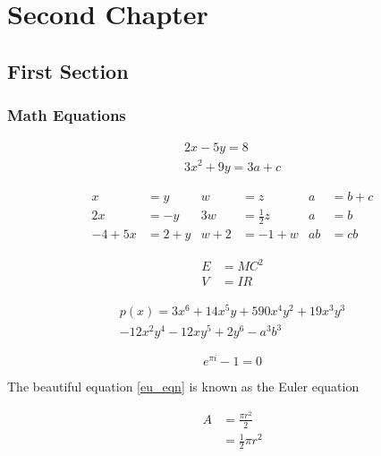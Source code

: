 \chapter{Second Chapter}
\lipsum[1-10]
\section{First Section}
\lipsum[1-10]
\subsection{Math Equations}

\begin{gather*} 
2x - 5y =  8 \\ 
3x^2 + 9y =  3a + c
\end{gather*}

\begin{align*}
x&=y           &  w &=z              &  a&=b+c\\
2x&=-y         &  3w&=\frac{1}{2}z   &  a&=b\\
-4 + 5x&=2+y   &  w+2&=-1+w          &  ab&=cb
\end{align*}

\begin{align} 
E &=MC^2 \\
V &=IR
\end{align}%
%
%


\begin{multline*}
p(x) = 3x^6 + 14x^5y + 590x^4y^2 + 19x^3y^3\\ 
- 12x^2y^4 - 12xy^5 + 2y^6 - a^3b^3
\end{multline*}

\begin{equation} \label{eu_eqn}
e^{\pi i} - 1 = 0
\end{equation}
 
The beautiful equation \ref{eu_eqn} is known as the Euler equation

\begin{equation} \label{eq1}
\begin{split}
A & = \frac{\pi r^2}{2} \\
 & = \frac{1}{2} \pi r^2
\end{split}
\end{equation}

